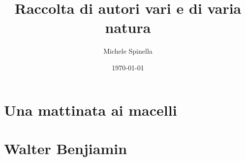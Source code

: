 \documentclass[ebook,11pt,oneside,openany]{memoir}
\begin{document}
\title{Raccolta di autori vari e di varia natura}
\author{Michele Spinella}
\date{\today}
\maketitle

\chapter*{Una mattinata ai macelli}

\chapter*{Walter Benjiamin}

\end{document}
